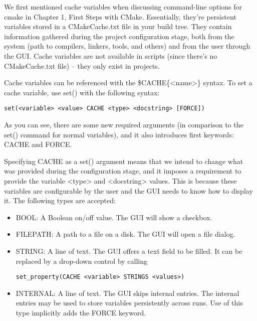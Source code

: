 
We first mentioned cache variables when discussing command-line options for cmake in Chapter 1, First Steps with CMake. Essentially, they're persistent variables stored in a CMakeCache.txt file in your build tree. They contain information gathered during the project configuration stage, both from the system (path to compilers, linkers, tools, and others) and from the user through the GUI. Cache variables are not available in scripts (since there's no CMakeCache.txt file) – they only exist in projects.

Cache variables can be referenced with the \$CACHE\{<name>\} syntax.
To set a cache variable, use set() with the following syntax: 

\begin{lstlisting}[style=styleCMake]
set(<variable> <value> CACHE <type> <docstring> [FORCE]) 
\end{lstlisting}

As you can see, there are some new required arguments (in comparison to the set() command for normal variables), and it also introduces first keywords: CACHE and FORCE.

Specifying CACHE as a set() argument means that we intend to change what was provided during the configuration stage, and it imposes a requirement to provide the variable <type> and <docstring> values. This is because these variables are configurable by the user and the GUI needs to know how to display it. The following types are accepted:

\begin{itemize}
\item 
BOOL: A Boolean on/off value. The GUI will show a checkbox.

\item 
FILEPATH: A path to a file on a disk. The GUI will open a file dialog.

\item 
STRING: A line of text. The GUI offers a text field to be filled. It can be replaced by a drop-down control by calling 
\begin{lstlisting}[style=styleCMake]
set_property(CACHE <variable> STRINGS <values>)
\end{lstlisting}

\item 
INTERNAL: A line of text. The GUI skips internal entries. The internal entries may be used to store variables persistently across runs. Use of this type implicitly adds the FORCE keyword.
\end{itemize}

